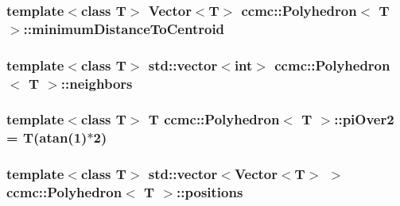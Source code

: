 \hypertarget{classccmc_1_1_polyhedron_afd77b1f8d574323a5b4e1b694890b7dc}{
\subsubsection[{minimum\-Distance\-To\-Centroid}]{\setlength{\rightskip}{0pt plus 5cm}template$<$class T$>$ {\bf Vector}$<$T$>$ {\bf ccmc\-::\-Polyhedron}$<$ T $>$\-::minimum\-Distance\-To\-Centroid}}\label{classccmc_1_1_polyhedron_afd77b1f8d574323a5b4e1b694890b7dc}
\hypertarget{classccmc_1_1_polyhedron_aa5b2b229e4e08b8ff1c03ff78fcb6a3b}{
\subsubsection[{neighbors}]{\setlength{\rightskip}{0pt plus 5cm}template$<$class T$>$ std\-::vector$<$int$>$ {\bf ccmc\-::\-Polyhedron}$<$ T $>$\-::neighbors}}\label{classccmc_1_1_polyhedron_aa5b2b229e4e08b8ff1c03ff78fcb6a3b}
\hypertarget{classccmc_1_1_polyhedron_a30dd6a2116a1aaad90753c8c0309eda6}{
\subsubsection[{pi\-Over2}]{\setlength{\rightskip}{0pt plus 5cm}template$<$class T$>$ T {\bf ccmc\-::\-Polyhedron}$<$ T $>$\-::pi\-Over2 = T(atan(1)$\ast$2)\hspace{0.3cm}{\ttfamily [static]}}}\label{classccmc_1_1_polyhedron_a30dd6a2116a1aaad90753c8c0309eda6}
\hypertarget{classccmc_1_1_polyhedron_a41195440d2192a6118e2990f09183179}{
\subsubsection[{positions}]{\setlength{\rightskip}{0pt plus 5cm}template$<$class T$>$ std\-::vector$<${\bf Vector}$<$T$>$ $>$ {\bf ccmc\-::\-Polyhedron}$<$ T $>$\-::positions}}\label{classccmc_1_1_polyhedron_a41195440d2192a6118e2990f09183179}
